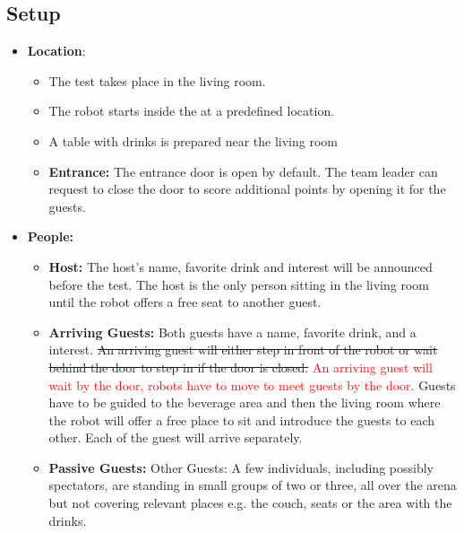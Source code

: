 \subsection*{Setup}
\begin{itemize}
	\item \textbf{Location}: 
	\begin{itemize}
	\item The test takes place in the living room.	
	\item The robot starts inside the \Arena{} at a predefined location.
	\item A table with drinks is prepared near the living room
	\item \textbf{Entrance:} The entrance door is open by default. The team leader can request to close the door to score additional points by opening it for the guests.
	\end{itemize}
	
	\item \textbf{People:} 
	\begin{itemize}
	\item \textbf{Host:} The host's name, favorite drink and interest will be announced before the test. The host is the only person sitting in the living room until the robot offers a free seat to another guest.
	\item \textbf{Arriving Guests:} Both guests have a name, favorite drink, and a interest. \sout{An arriving guest will either step in front of the robot or wait behind the door to step in if the door is closed.} \textcolor{red}{An arriving guest will wait by the door, robots have to move to meet guests by the door.} Guests have to be guided to the beverage area and then the living room where the robot will offer a free place to sit and introduce the guests to each other. Each of the guest will arrive separately. 
	\item \textbf{Passive Guests:} Other Guests: A few individuals, including possibly spectators, are standing in small groups of two or three, all over the arena but not covering relevant places e.g. the couch, seats or the area with the drinks.
	\end{itemize}

\end{itemize}


